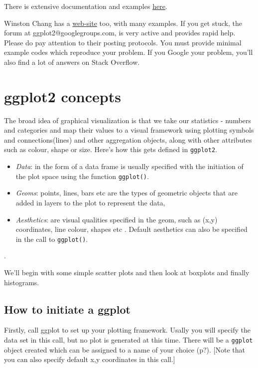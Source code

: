 \documentclass[titlepage]{book}\usepackage{knitr}
\begin{document}
There is extensive documentation and examples \href{https://ggplot2.tidyverse.org/}{here}.

Winston Chang has a \href{http://www.cookbook-r.com/}{web-site} too, with many examples. If you get stuck, the forum at ggplot2@googlegroups.com, is very active and provides rapid help.  Please do pay attention to their posting protocols.  You must provide minimal example codes which reproduce your problem. If you Google your problem, you'll also find a lot of answers on Stack Overflow.

\section{ggplot2 concepts}

The broad idea of graphical visualization is that we take our statistics - numbers and categories and map their values to a visual framework using plotting symbols and connections(lines) and other aggregation objects, along with other attributes such as colour, shape or size. Here's how this gets defined in \texttt{ggplot2}.

\begin{itemize}
\item \emph{Data}: in the form of a data frame is usually specified with the initiation of the plot space using the function \texttt{ggplot()}.
\item \emph{Geoms}: points, lines, bars etc are the types of geometric objects that are added in layers to the plot to represent the data,
\item \emph{Aesthetics}: are visual qualities specified in the geom, such as (x,y) coordinates, line colour, shapes etc .  Default aesthetics can also be specified in the call to \texttt{ggplot()}.
\end{itemize}.

We'll begin with some simple scatter plots and then look at boxplots and finally histograms.

\subsection{How to initiate a ggplot}

Firstly, call ggplot to set up your plotting framework.  Usally you will specify the data set in this call, but no plot is generated at this time.  There will be a  \texttt{ggplot} object created which can be assigned to a name of your choice (p?). [Note that you can also specify default x,y coordinates in this call.]
\end{document}
